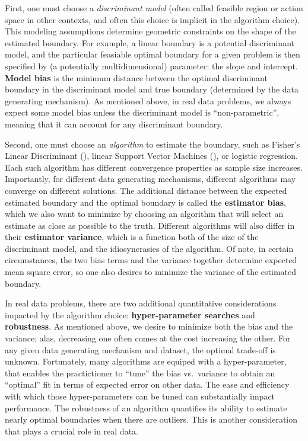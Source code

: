\documentclass[10pt]{article}
\begin{document}


First, one must choose a \emph{discriminant model} (often called feasible region or action space in other contexts, and often this choice is implicit in the algorithm choice). 
This modeling assumptions determine geometric constraints on the shape of the estimated boundary.
For example, a linear boundary is a potential discriminant model, and the particular feasiable optimal boundary for a given problem is then specified by (a potentially multidimensional) parameter: the slope and intercept.  \textbf{Model bias}  is the minimum distance between the optimal discriminant boundary in the discriminant model and true boundary (determined by the data generating mechanism).  As mentioned above, in real data problems, we always expect some model bias unless the discriminant model is ``non-parametric'', meaning that it can account for any discriminant boundary.

Second, one must choose an \emph{algorithm} to estimate the boundary, such as Fisher’s Linear Discriminant (\Fld), linear Support Vector Machines (\Svm), or logistic regression.  Each such algorithm has different convergence properties as sample size increases.  Importantly, for different data generating mechanisms, different algorithms may converge on different solutions.  The additional distance between the expected estimated boundary and the optimal boundary is called the \textbf{estimator bias}, which we also want to minimize by choosing an algorithm that will select an estimate as close as possible to the truth.  Different algorithms will also differ in their \textbf{estimator variance}, which is a function both of the size of the discriminant model, and the idiosyncrasies of the algorithm.  Of note, in certain circumstances, the two bias terms and the variance together determine expected mean square error, so one also desires to minimize the variance of the estimated boundary. 

In real data problems, there are two additional quantitative considerations impacted by the algorithm choice: \textbf{hyper-parameter searches} and \textbf{robustness}. As mentioned above, we desire to minimize both the bias and the variance; alas, decreasing one often comes at the cost increasing the other.  For any given data generating mechanism and dataset, the optimal trade-off is unknown. Fortunately, many algorithms are equiped with a hyper-parameter, that enables the practictioner to ``tune'' the bias vs.~variance to obtain an ``optimal'' fit in terms of expected error on other data.  The ease and efficiency with which those hyper-parameters can be tuned can substantially impact performance.   The robustness of an algorithm quantifies its ability to estimate nearly optimal boundaries when there are outliers. This is another consideration that plays a crucial role in real data.  
\end{document}
